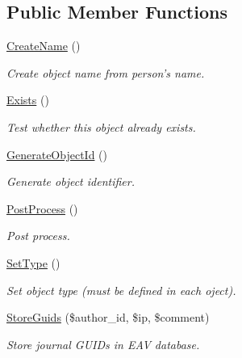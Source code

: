 \subsection*{Public Member Functions}
\begin{CompactItemize}
\item 
\hypertarget{class_journal_761ca6bdec680103016e34a3312d55dd}{
\hyperlink{class_journal_761ca6bdec680103016e34a3312d55dd}{CreateName} ()}
\label{class_journal_761ca6bdec680103016e34a3312d55dd}

\begin{CompactList}\small\item\em Create object name from person's name. \item\end{CompactList}\item 
\hyperlink{class_journal_972ce1a8531e15757579826aca9f8e49}{Exists} ()
\begin{CompactList}\small\item\em Test whether this object already exists. \item\end{CompactList}\item 
\hyperlink{class_journal_d28269cb6daa116d9c26ad91ee0d08f7}{GenerateObjectId} ()
\begin{CompactList}\small\item\em Generate object identifier. \item\end{CompactList}\item 
\hyperlink{class_journal_d1beb0e9bc12b0cc585180aab4e1bdad}{PostProcess} ()
\begin{CompactList}\small\item\em Post process. \item\end{CompactList}\item 
\hypertarget{class_journal_17598b87c6028e18ff37966af9c76ecf}{
\hyperlink{class_journal_17598b87c6028e18ff37966af9c76ecf}{SetType} ()}
\label{class_journal_17598b87c6028e18ff37966af9c76ecf}

\begin{CompactList}\small\item\em Set object type (must be defined in each oject). \item\end{CompactList}\item 
\hyperlink{class_journal_b182da20eb5ceb7d1709e102a4666344}{StoreGuids} (\$author\_\-id, \$ip, \$comment)
\begin{CompactList}\small\item\em Store journal GUIDs in EAV database. \item\end{CompactList}\end{CompactItemize}


